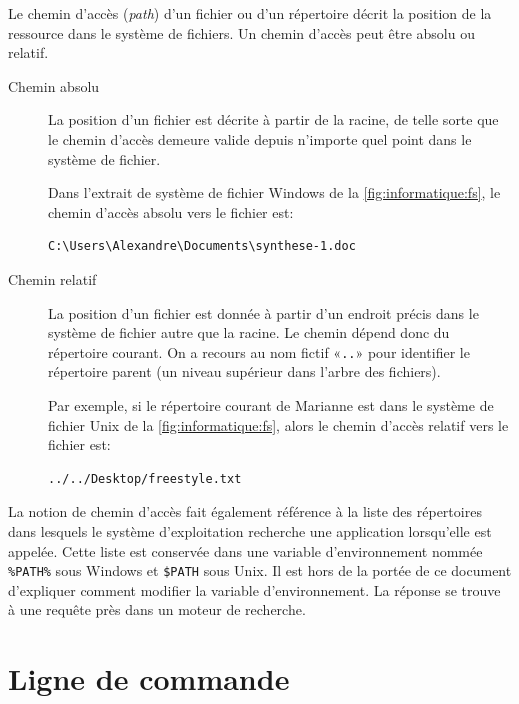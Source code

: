 Le chemin d'accès (\emph{path}) d'un fichier ou
d'un répertoire décrit la position de la ressource dans le système de
fichiers. Un chemin d'accès peut être absolu ou relatif.
\begin{description}
\item[Chemin absolu]  La position d'un
  fichier est décrite à partir de la racine, de telle sorte que le
  chemin d'accès demeure valide depuis n'importe quel point dans le
  système de fichier.

  Dans l'extrait de système de fichier Windows de la
  \autoref{fig:informatique:fs}, le chemin d'accès absolu vers le
  fichier  est:
\begin{Schunk}
\begin{Verbatim}
C:\Users\Alexandre\Documents\synthese-1.doc
\end{Verbatim}
\end{Schunk}
\item[Chemin relatif]  La position d'un
  fichier est donnée à partir d'un endroit précis dans le système de
  fichier autre que la racine. Le chemin dépend donc du répertoire
  courant. On a recours au nom fictif «\verb=..=» pour identifier le
  répertoire parent (un niveau supérieur dans l'arbre des fichiers).

  Par exemple, si le répertoire courant de Marianne est
   dans le système de fichier Unix de la
  \autoref{fig:informatique:fs}, alors le chemin d'accès relatif vers
  le fichier  est:
\begin{Schunk}
\begin{Verbatim}
../../Desktop/freestyle.txt
\end{Verbatim}
\end{Schunk}
\end{description}

La notion de chemin d'accès fait également référence à la liste des
répertoires dans lesquels le système d'exploitation recherche une
application lorsqu'elle est appelée. Cette liste est conservée dans
une variable d'environnement nommée \verb=%PATH%= sous Windows
et \verb=$PATH= sous Unix. Il est hors de la portée de ce
document d'expliquer comment modifier la variable d'environnement. La
réponse se trouve à une requête près dans un moteur de recherche.


\section{Ligne de commande}
\label{sec:informatique:cli}

